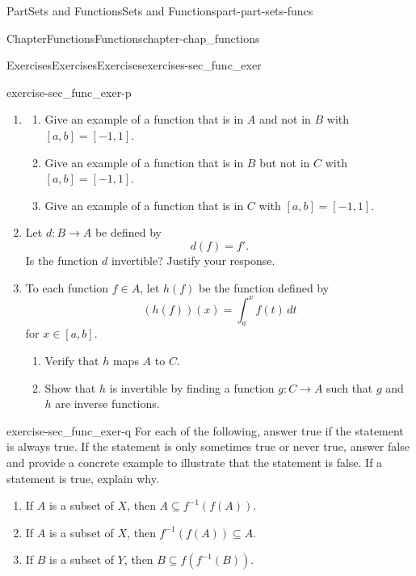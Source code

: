 \documentclass[oneside,10pt,]{book}
\numberwithin{equation}{chapter}
\begin{document}
\begin{partptx}{Part}{Sets and Functions}{}{Sets and Functions}{}{}{part-part-sets-funcs}
\begin{chapterptx}{Chapter}{Functions}{}{Functions}{}{}{chapter-chap_functions}
\begin{exercises-section}{Exercises}{Exercises}{}{Exercises}{}{}{exercises-sec_func_exer}
\begin{divisionexercise}{16}{}{}{exercise-sec_func_exer-p}
\begin{enumerate}[font=\bfseries,label=(\alph*),ref=\alph*]%
\item{}\begin{enumerate}[font=\bfseries,label=(\roman*),ref=\theenumi.\roman*]%
\item{}Give an example of a function that is in \(A\) and not in \(B\) with \([a,b] = [-1,1]\).%
\item{}Give an example of a function that is in \(B\) but not in \(C\) with \([a,b] = [-1,1]\).%
\item{}Give an example of a function that is in \(C\) with \([a,b] = [-1,1]\).%
\end{enumerate}%
\item{}Let \(d:B \to A\) be defined by%
\begin{equation*}
d(f) = f'\text{.}
\end{equation*}
Is the function \(d\) invertible? Justify your response.%
\item{}To each function \(f \in A\), let \(h(f)\) be the function defined by%
\begin{equation*}
(h(f))(x) = \int_a^x f(t) \, dt
\end{equation*}
for \(x \in [a,b]\).%
\begin{enumerate}[font=\bfseries,label=(\roman*),ref=\theenumi.\roman*]%
\item{}Verify that \(h\) maps \(A\) to \(C\).%
\item{}Show that \(h\) is invertible by finding a function \(g : C \to A\) such that \(g\) and \(h\) are inverse functions.%
\end{enumerate}%
\end{enumerate}%
\end{divisionexercise}%
\begin{divisionexercise}{17}{}{}{exercise-sec_func_exer-q}%
For each of the following, answer true if the statement is always true. If the statement is only sometimes true or never true, answer false and provide a concrete example to illustrate that the statement is false. If a statement is true, explain why.%
\begin{enumerate}[font=\bfseries,label=(\alph*),ref=\alph*]%
\item{}If \(A\) is a subset of \(X\), then \(A \subseteq f^{-1}(f(A))\).%
\item{}If \(A\) is a subset of \(X\), then \(f^{-1}(f(A)) \subseteq A\).%
\item{}If \(B\) is a subset of \(Y\), then \(B \subseteq f(f^{-1}(B))\).%

\end{enumerate}
\end{divisionexercise}
\end{exercises-section}
\end{chapterptx}
\end{partptx}
\end{document}
